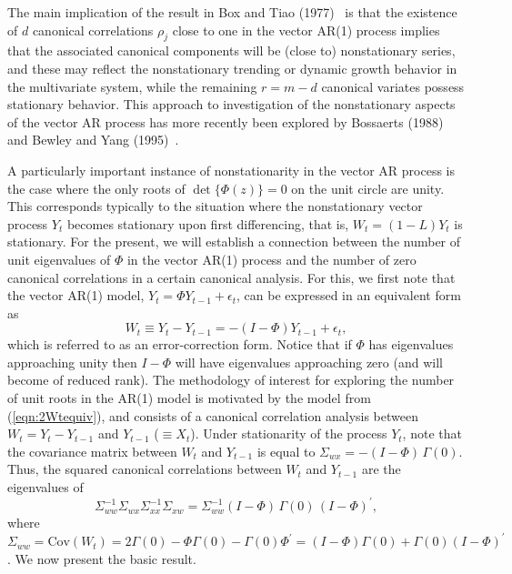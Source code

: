 The main implication of the result in Box and Tiao (1977)~\cite{box77} is that the existence of $d$ canonical correlations $\rho_j$ close to one in the vector AR(1) process implies that the associated canonical components will be (close to) nonstationary series, and these may reflect the nonstationary trending or dynamic growth behavior in the multivariate system, while the remaining $r = m-d$ canonical variates possess stationary behavior. This approach to investigation of the nonstationary aspects of the vector AR process has more recently been explored by Bossaerts (1988)~\cite{bossaerts1988common} and Bewley and Yang (1995)~\cite{bewyang}.


A particularly important instance of nonstationarity in the vector AR process is the case where the only roots of $\det\{ \Phi (z) \} = 0$ on the unit circle are unity.  This corresponds typically to the situation where the nonstationary vector process $Y_t$ becomes stationary upon first differencing, that is, $W_t = (1-L) Y_t$ is stationary. For the present, we will establish a connection between the number of unit eigenvalues of $\Phi$ in the vector AR(1) process and the number of zero canonical correlations in a certain canonical analysis. For this, we first note that the vector AR(1) model, $Y_t = \Phi Y_{t-1} + \epsilon_t$, can be expressed in an equivalent form as
	\begin{equation}\label{eqn:2Wtequiv}
	W_t \equiv Y_t - Y_{t-1} = - (I - \Phi ) Y_{t-1} + \epsilon_t , 
	\end{equation}
which is referred to as an error-correction form.  Notice that if $\Phi$ has eigenvalues approaching unity then $I-\Phi$ will have eigenvalues approaching zero (and will become of reduced rank).  The methodology of interest for exploring the number of unit roots in the AR(1) model is motivated by the model from (\ref{eqn:2Wtequiv}), and consists of a canonical correlation analysis between $W_t = Y_t - Y_{t-1}$ and $Y_{t-1}$ ($\equiv X_t$).  Under stationarity of the process $Y_t$, note that the covariance matrix between $W_t$ and $Y_{t-1}$ is equal to $\Sigma_{wx} = - (I- \Phi )\, \Gamma (0)$.  Thus, the squared canonical correlations between $W_t$ and $Y_{t-1}$ are the eigenvalues of
	\begin{equation}\label{eqn:2doublesigma}
	\Sigma_{ww}^{-1} \Sigma_{wx} \Sigma_{xx}^{-1} \Sigma_{xw}= \Sigma_{ww}^{-1} (I- \Phi )\, \Gamma (0) \,(I- \Phi )^{\prime} , 
	\end{equation}
where $\Sigma_{ww} = \mbox{Cov}(W_t) = 2 \Gamma (0) - \Phi \Gamma (0) - \Gamma (0)\Phi^{\prime} = (I- \Phi )\Gamma (0) + \Gamma (0) (I- \Phi)^{\prime}$. We now present the basic result. \\


